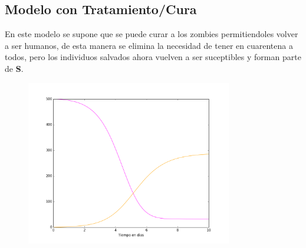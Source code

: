 \documentclass[12pt]{article}
\begin{document}
\subsection{Modelo con Tratamiento/Cura}
En este modelo se supone que se puede curar a los zombies permitiendoles volver a ser humanos, de esta manera se elimina la necesidad de tener en cuarentena a todos, pero los individuos salvados ahora vuelven a ser suceptibles y forman parte de \textbf{S}. 

\begin{figure}[H]
	\includegraphics[width=9cm]{tratamiento.png}
\end{figure}
\end{document}
